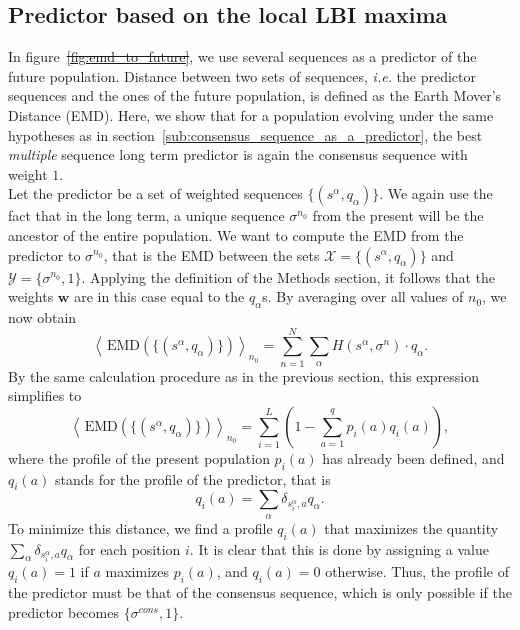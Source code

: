 \documentclass[reprint,amsmath,amssymb,superscriptaddress,showpacs,rmp]{revtex4-1}
\newcommand{\sref}[1]{S\ref{#1}}
\providecommand{\DIFadd}[1]{{\protect\color{blue}\uwave{#1}}} %
\providecommand{\DIFdel}[1]{{\protect\color{red}\sout{#1}}}                      %
\providecommand{\DIFaddbegin}{} %
\providecommand{\DIFaddend}{} %
\providecommand{\DIFdelbegin}{} %
\providecommand{\DIFdelend}{} %
\newcommand{\DIFscaledelfig}{0.5}
\newlength{\DIFdelgraphicswidth} %
\newlength{\DIFdelgraphicsheight} %
\newcommand{\DIFaddincludegraphics}[2][]{{\color{blue}\fbox{\DIFOincludegraphics[#1]{#2}}}} %
\newcommand{\DIFdelincludegraphics}[2][]{%
\sbox{\DIFdelgraphicsbox}{\DIFOincludegraphics[#1]{#2}}%
\settoboxwidth{\DIFdelgraphicswidth}{\DIFdelgraphicsbox} %
\settoboxtotalheight{\DIFdelgraphicsheight}{\DIFdelgraphicsbox} %
\scalebox{\DIFscaledelfig}{%
\parbox[b]{\DIFdelgraphicswidth}{\usebox{\DIFdelgraphicsbox}\\[-\baselineskip] \rule{\DIFdelgraphicswidth}{0em}}\llap{\resizebox{\DIFdelgraphicswidth}{\DIFdelgraphicsheight}{%
\setlength{\unitlength}{\DIFdelgraphicswidth}%
\begin{picture}(1,1)%
\thicklines\linethickness{2pt} %
{\color[rgb]{1,0,0}\put(0,0){\framebox(1,1){}}}%
{\color[rgb]{1,0,0}\put(0,0){\line( 1,1){1}}}%
{\color[rgb]{1,0,0}\put(0,1){\line(1,-1){1}}}%
\end{picture}%
}\hspace*{3pt}}} %
} %
\DeclareRobustCommand{\DIFaddbegin}{\DIFOaddbegin \let\includegraphics\DIFaddincludegraphics} %
\DeclareRobustCommand{\DIFaddend}{\DIFOaddend \let\includegraphics\DIFOincludegraphics} %
\DeclareRobustCommand{\DIFdelbegin}{\DIFOdelbegin \let\includegraphics\DIFdelincludegraphics} %
\DeclareRobustCommand{\DIFdelend}{\DIFOaddend \let\includegraphics\DIFOincludegraphics} %
\begin{document}

\subsection{Predictor based on the local LBI maxima} %
\label{sub:predictor_based_on_the_local_lbi_maxima}
	In figure~\DIFdelbegin \DIFdel{\ref{fig:emd_to_future}}\DIFdelend \DIFaddbegin \DIFadd{\sref{fig:emd_to_future}}\DIFaddend , we use several sequences as a predictor of the future population. Distance between two sets of sequences, \emph{i.e.} the predictor sequences and the ones of the future population, is defined as the Earth Mover's Distance (EMD). Here, we show that for a population evolving under the same hypotheses as in section~\ref{sub:consensus_sequence_as_a_predictor}, the best \emph{multiple} sequence long term predictor is again the consensus sequence with weight $1$. \\
	Let the predictor be a set of weighted sequences $\{(s^\alpha, q_\alpha)\}$. We again use the fact that in the long term, a unique sequence $\sigma^{n_0}$ from the present will be the ancestor of the entire population. We want to compute the EMD from the predictor to $\sigma^{n_0}$, that is the EMD between the sets $\mathcal{X}=\{(s^\alpha, q_\alpha)\}$ and $\mathcal{Y} = \{\sigma^{n_0},1\}$. Applying the definition of the Methods section, it follows that the weights $\mathbf{w}$ are in this case equal to the $q_\alpha$s. By averaging over all values of $n_0$, we now obtain
	$$ \left\langle \,\text{EMD}\left(\{(s^\alpha, q_\alpha)\}\right) \right\rangle_{n_0} = \sum_{n=1}^N\sum_{\alpha} H(s^\alpha, \sigma^n)\cdot q_\alpha.$$
	By the same calculation procedure as in the previous section, this expression simplifies to
	$$ \left\langle \,\text{EMD}\left(\{(s^\alpha, q_\alpha)\}\right)\right\rangle_{n_0} = \sum_{i=1}^L\left( 1 - \sum_{a=1}^q p_i(a)q_i(a) \right), $$
	where the profile of the present population $p_i(a)$ has already been defined, and $q_i(a)$ stands for the profile of the predictor, that is
	$$ q_i(a) = \sum_{\alpha} \delta_{s^\alpha_i, a}q_\alpha.$$
	To minimize this distance, we find a profile $q_i(a)$ that maximizes the quantity $\sum_{\alpha} \delta_{s^\alpha_i, a}q_\alpha$ for each position $i$. It is clear that this is done by assigning a value $q_i(a)=1$ if $a$ maximizes $p_i(a)$, and $q_i(a)=0$ otherwise. Thus, the profile of the predictor must be that of the consensus sequence, which is only possible if the predictor becomes $\{\sigma^{cons},1\}$.
\DIFaddbegin 
\end{document}
